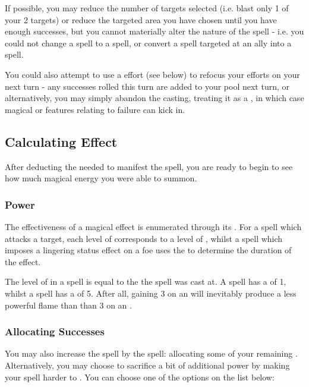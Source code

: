 	If possible, you may reduce the number of targets selected (i.e. blast only 1 of your 2 targets) or reduce the targeted area you have chosen until you have enough successes, but you cannot materially alter the nature of the spell - i.e. you could not change a  spell to a  spell, or convert a spell targeted at an ally into a  spell.  
	
	You could also attempt to use a  effort (see below) to refocus your efforts on your next turn - any successes rolled this turn are added to your pool next turn, or alternatively, you may simply abandon the casting, treating it as a , in which case magical or  features relating to failure can kick in.
	
	


\subsection{Calculating Effect}

After deducting the  needed to manifest the spell, you are ready to begin to see how much magical energy you were able to summon.

\subsubsection{Power}

The effectiveness of a magical effect is enumerated through its . For a spell which attacks a target, each level of  corresponds to a level of , whilst a spell which imposes a lingering status effect on a foe uses the  to determine the duration of the effect. 


The  level of  in a spell is equal to the  the spell was cast at. A \levelOne{} spell has a  of 1, whilst a \levelFive{} spell has a  of 5. After all, gaining 3  on an  will inevitably produce a less powerful flame than than 3  on an .




\subsubsection{Allocating Successes}
You may also increase the spell  by  the spell: allocating some of your remaining . Alternatively, you may choose to sacrifice a bit of additional power by making your spell harder to . You can choose one of the options on the list below:


